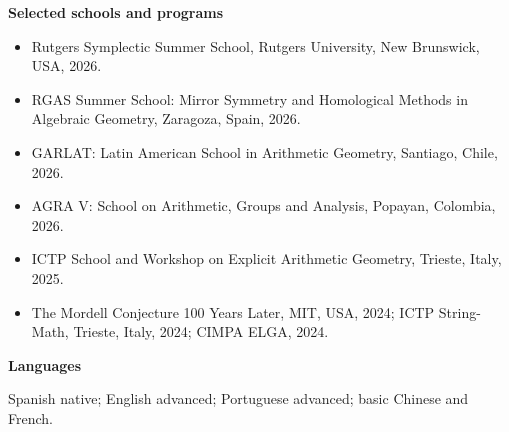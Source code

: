 \documentclass[10pt,a4paper]{article}
\newcommand{\cvsection}[1]{%
  \vspace{6pt}
  {\large\bfseries\color{cvteal}#1}\par
  \vspace{1pt}{\color{cvrule}\hrule height 0.5pt}\vspace{3pt}
}
\newcommand{\cvitem}[1]{\item #1}
\begin{document}
\cvsection{Selected schools and programs}
\begin{itemize}
  \cvitem{Rutgers Symplectic Summer School, Rutgers University, New Brunswick, USA, 2026.}
  \cvitem{RGAS Summer School: Mirror Symmetry and Homological Methods in Algebraic Geometry, Zaragoza, Spain, 2026.}
  \cvitem{GARLAT: Latin American School in Arithmetic Geometry, Santiago, Chile, 2026.}
  \cvitem{AGRA V: School on Arithmetic, Groups and Analysis, Popayan, Colombia, 2026.}
  \cvitem{ICTP School and Workshop on Explicit Arithmetic Geometry, Trieste, Italy, 2025.}
  \cvitem{The Mordell Conjecture 100 Years Later, MIT, USA, 2024; ICTP String-Math, Trieste, Italy, 2024; CIMPA ELGA, 2024.}
\end{itemize}

\cvsection{Languages}
Spanish native; English advanced; Portuguese advanced; basic Chinese and French.
\end{document}
